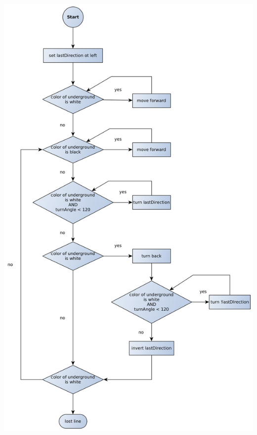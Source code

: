 \documentclass[11pt,oneside,a4paper]{scrartcl}
\begin{document}
\begin{center}
\includegraphics[width=\textwidth,height=\textheight,keepaspectratio]{flowChart.png}
\end{center}
\end{document}
